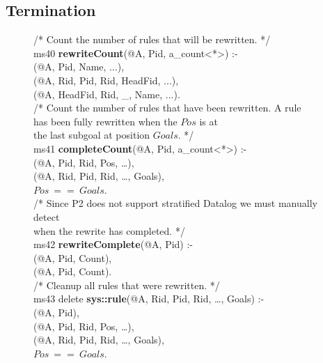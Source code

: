 \subsection{Termination}

\begin{figure}[!t]
\ssp
\centering
\begin{boxedminipage}{\linewidth}
/* Count the number of rules that will be rewritten. */ \\
ms40 {\bf rewriteCount}(@A, Pid, a\_count<*>) :- \\
(@A, Pid, Name, ...), \\
(@A, Rid, Pid, Rid, HeadFid, ...), \\
(@A, HeadFid, Rid, \_, Name, ...). \\
	
/* Count the number of rules that have been rewritten. A rule \\
has been fully rewritten when the  $Pos$ is at \\
the last subgoal at position $Goals$. */ \\
ms41 {\bf completeCount}(@A, Pid, a\_count<*>) :- \\
(@A, Pid, Rid, Pos, \ldots), \\
(@A, Rid, Pid, Rid, \ldots, Goals), \\
\datalogspace $Pos\ ==\ Goals$. \\
	
/* Since P2 does not support stratified Datalog we must manually detect  \\
when the rewrite has completed. */ \\
ms42 {\bf rewriteComplete}(@A, Pid) :-  \\
(@A, Pid, Count), \\
(@A, Pid, Count). \\

/* Cleanup all rules that were rewritten. */ \\
ms43 delete {\bf sys::rule}(@A, Rid, Pid, Rid, \ldots, Goals) :- \\
(@A, Pid), \\
(@A, Pid, Rid, Pos, \ldots), \\
(@A, Rid, Pid, Rid, \ldots, Goals), \\
\datalogspace $Pos\ ==\ Goals$. \\


\end{boxedminipage}
\end{figure}
